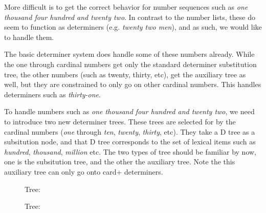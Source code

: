 More difficult is to get the correct behavior for number sequences
such as {\it one
thousand four hundred and twenty two}.  In contrast to the number lists, these
do seem to function as determiners (e.g. {\it twenty two men\/}), and as such, we would like
to handle them. 

The basic determiner system does handle some of these numbers already.  While
the one through cardinal numbers get only the standard determiner substitution
tree, the other numbers (such as twenty, thirty, etc), get the auxiliary tree
as well, but they are constrained to only go on other cardinal numbers.  This
handles determiners such as {\it thirty-one}.  

To handle numbers such as {\it one thousand four hundred and twenty two}, we need
to introduce two new determiner trees.  These trees are selected for by the
cardinal numbers ({\it one\/} through {\it ten}, {\it twenty}, {\it thirty}, etc).  They take a D
tree as a subsitution node, and that D tree corresponds to the set of lexical
items such as {\it hundred}, {\it thousand}, {\it million\/} etc.  The two types of tree
should be familiar by now, one is the subsitution tree, and the other the
auxiliary tree.  Note the this auxiliary tree can only go onto card+
determiners.

\begin{figure}[ht]
\centering
{}
\caption{ Tree:  }
\end{figure}

\begin{figure}[ht]
\centering
{}
\caption{ Tree: }
\end{figure}


			


